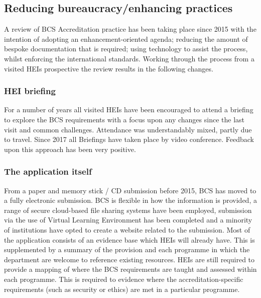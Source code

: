 \documentclass[sigconf]{acmart}
\begin{document}
\subsection{Reducing bureaucracy/enhancing practices}
A review of BCS Accreditation practice has been taking place since 2015 with the intention of adopting an enhancement-oriented agenda; reducing the amount of bespoke documentation that is required; using technology to assist the process, whilst enforcing the international standards. Working through the process from a visited HEIs prospective the review results in the following changes.

\subsubsection{HEI briefing}
For a number of years all visited HEIs have been encouraged to attend a briefing to explore the BCS requirements with a focus upon any changes since the last visit and common challenges. %
Attendance was understandably mixed, partly due to travel. Since 2017 all Briefings have taken place by video conference. Feedback upon this approach has been very positive.

\subsubsection{The application itself}
From a paper and memory stick / CD submission before 2015, BCS has moved to a fully electronic submission. BCS is flexible in how the information is provided, a range of secure cloud-based file sharing systems have been employed, submission via the use of Virtual Learning Environment has been completed and a minority of institutions have opted to create a website related to the submission. Most of the application consists of an evidence base which HEIs will already have. This is supplemented by a summary of the provision and each programme in which the department are welcome to reference existing resources. HEIs are still required to provide a mapping of where the BCS requirements are taught and assessed within each programme. This is required to evidence where the accreditation-specific requirements (such as security or ethics) are met in a particular programme.
\end{document}
